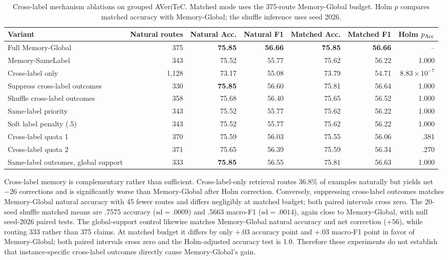 \documentclass[runningheads]{llncs}
\begin{document}
\begin{table}[t]
\caption{Cross-label mechanism ablations on grouped AVeriTeC. Matched mode
uses the 375-route Memory-Global budget. Holm $p$ compares matched accuracy
with Memory-Global;
the shuffle inference uses seed 2026.}
\label{tab:cross-label-mechanism}
\centering\small
\begin{tabular}{lrrrrrr}
\toprule
Variant & Natural routes & Natural Acc. & Natural F1 & Matched Acc. & Matched F1 & Holm $p_{\rm Acc}$ \\
\midrule
Full Memory-Global & 375 & \textbf{75.85} & \textbf{56.66} & \textbf{75.85} & \textbf{56.66} & -- \\
Memory-SameLabel & 343 & 75.52 & 55.77 & 75.62 & 56.22 & 1.000 \\
Cross-label only & 1,128 & 73.17 & 55.08 & 73.79 & 54.71 & $8.83{\times}10^{-7}$ \\
Suppress cross-label outcomes & 330 & \textbf{75.85} & 56.60 & 75.81 & 56.64 & 1.000 \\
Shuffle cross-label outcomes & 358 & 75.68 & 56.40 & 75.65 & 56.52 & 1.000 \\
Same-label priority & 343 & 75.52 & 55.77 & 75.62 & 56.22 & 1.000 \\
Soft label penalty (.5) & 343 & 75.52 & 55.77 & 75.62 & 56.22 & 1.000 \\
Cross-label quota 1 & 370 & 75.59 & 56.03 & 75.55 & 56.06 & .381 \\
Cross-label quota 2 & 371 & 75.65 & 56.39 & 75.59 & 56.34 & .270 \\
Same-label outcomes, global support & 333 & \textbf{75.85} & 56.55 & 75.81 & 56.63 & 1.000 \\
\bottomrule
\end{tabular}
\end{table}

Cross-label memory is complementary rather than sufficient. Cross-label-only retrieval routes 36.8\%
of examples naturally but yields net $-26$ corrections and is significantly
worse than Memory-Global after Holm correction. Conversely, suppressing cross-label outcomes matches Memory-Global natural
accuracy with 45 fewer routes and differs negligibly at matched budget; both
paired intervals cross zero. The 20-seed shuffle matched means are
.7575 accuracy ($\mathrm{sd}=.0009$) and .5663 macro-F1
($\mathrm{sd}=.0014$), again close to Memory-Global, with null seed-2026 paired tests.
The global-support control likewise matches Memory-Global natural accuracy and net correction ($+56$), while
routing 333 rather than 375 claims. At matched budget it differs by only
$+.03$ accuracy point and $+.03$ macro-F1 point in favor of Memory-Global; both paired
intervals cross zero and the Holm-adjusted accuracy test is 1.0. Therefore
these experiments do not establish that instance-specific cross-label
outcomes directly cause Memory-Global's gain.
\end{document}
